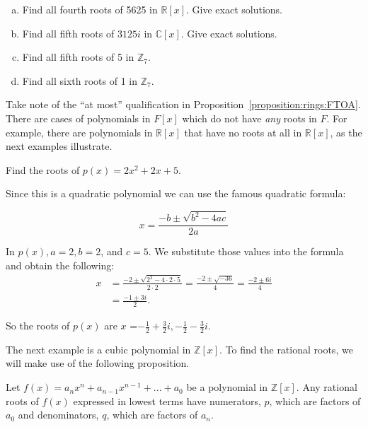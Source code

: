 \begin{exercise}\label{exercise:rings:roots}
\begin{enumerate}[(a)]
\item
Find all fourth roots of 5625 in $\mathbb{R}[x]$. Give exact solutions.
\item
Find all fifth roots of $3125i$ in $\mathbb{C}[x]$. Give exact solutions. 
\item
Find all fifth roots of 5 in $\mathbb{Z}_7$.
\item
Find all sixth roots of 1 in $\mathbb{Z}_7$.
\end{enumerate}
\end{exercise}


Take note of the ``at most'' qualification in Proposition~\ref{proposition:rings:FTOA}. There are cases of polynomials in $F[x]$ which do not have  \emph{any} roots in $F$. For example, there are polynomials in $\mathbb{R}[x]$ that have no roots at all in $\mathbb{R}[x]$, as the next examples illustrate.

\begin{example}\label{example:rings:poly_complex} 
Find the roots of $p(x)=2x^2+2x+5$.

Since this is a quadratic polynomial we can use the famous quadratic formula:

$$x=\frac {-b \pm \sqrt{b^2-4ac}}{2a}$$

In $p(x), a=2, b=2$, and $c=5.$ We substitute those values into the formula and obtain the following:
\begin{align*}
x&=\frac {-2 \pm \sqrt{2^2-4\cdot 2\cdot 5}}{2\cdot 2}=\frac {-2 \pm \sqrt{-36}}{4}=\frac {-2 \pm 6i}{4}\\
&=\frac {-1 \pm 3i}{2}.
\end{align*}

So the roots of $p(x)$ are $x$ ={$-\frac{1}{2}+\frac{3}{2}i, -\frac{1}{2}-\frac{3}{2}i$}.
\end{example}

The next example is a cubic polynomial in $\mathbb{Z}[x]$. To find the rational roots, we will make use of the following proposition.

\begin{prop}\label{proposition:rings:Rationalroots}
Let $f(x) = a_{n}x^n+a_{n-1}x^{n-1}+...+a_{0}$ be a polynomial in $\mathbb{Z}[x]$. Any rational roots of $f(x)$ expressed in lowest terms have numerators, $p$, which are factors of $a_{0}$ and denominators, $q$, which are factors of $a_{n}$.
\end{prop}

